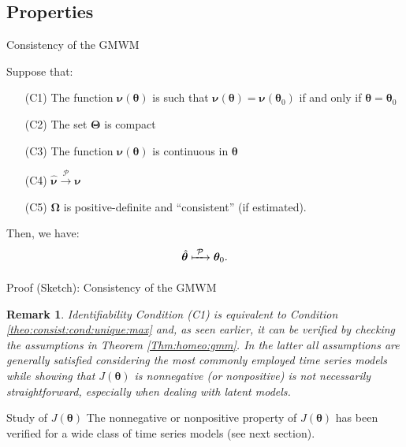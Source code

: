 \documentclass[envcountsect,usenames,dvipsnames]{beamer}
\theoremstyle{mystyle}
\newtheorem{Remark}{Remark}
\begin{document}
\subsection{Properties}
\begin{frame}{Consistency of the GMWM}




\begin{Lemma}
Suppose that:
\begin{itemize}
    \item[(C1)] The function $\bm{\nu}(\bm{\theta})$ is such that $\bm{\nu}(\bm{\theta})=\bm{\nu}(\bm{\theta}_0)$ if and only if $\bm{\theta}=\bm{\theta}_0$
    \item[(C2)] The set $\bm{\Theta}$ is compact
    \item[(C3)] The function $\bm{\nu}(\bm{\theta})$ is continuous in $\bm{\theta}$
    \item[(C4)] $\hat{\bm{\nu}}  \overset{\mathcal{P}}{\rightarrow} \bm{\nu}$
    \item[(C5)] $\mathbf{\Omega}$ is positive-definite and ``consistent'' (if estimated).
\end{itemize}
%
Then, we have:
%
\begin{equation*}
    \hat{\bm{\theta}}  \xmapsto[\;\;\;\;\; ]{\mathcal{P}} \bm{\theta}_0.
\end{equation*}
\end{Lemma}

\end{frame}


\begin{frame}{Proof (Sketch): Consistency of the GMWM}
 
\begin{Remark}{Identifiability}
Condition (C1) is equivalent to Condition \ref{theo:consist:cond:unique:max} and, as seen earlier, it can be verified by checking the assumptions in Theorem \ref{Thm:homeo:gmm}. In the latter all assumptions are generally satisfied considering the most commonly employed time series models while showing that $J(\bm{\theta})$ is nonnegative (or nonpositive) is not necessarily straightforward, especially when dealing with latent models.
\end{Remark}    

\begin{alertblock}{Study of $J(\bm{\theta})$}
The nonnegative or nonpositive property of $J(\bm{\theta})$ has been verified for a wide class of time series models (see next section).
\end{alertblock}

\end{frame}
\end{document}

